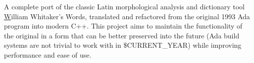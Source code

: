 \documentclass[11pt]{article}
\begin{document}
\begin{paracol}{2}
{A complete port of the classic Latin morphological analysis and dictionary tool \href {https://en.wikipedia.org/wiki/William\_Whitaker\%27s\_Words>}William Whitaker's Words, translated and refactored from the original 1993 Ada program into modern C++. This project aims to maintain the functionality of the original in a form that can be better preserved into the future (Ada build systems are not trivial to work with in \$CURRENT\_YEAR) while improving performance and ease of use. 


    

              
}    




    \iffalse

    \normaltext \hfill \tiny Last updated \today

    \fi

    \end{paracol}
\end{document}
